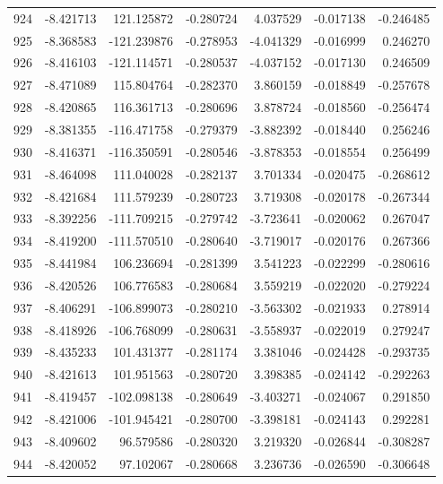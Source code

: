 \begin{tabular}{rrrrrrr}
 924 &  -8.421713 &  121.125872 & -0.280724 &   4.037529 &  -0.017138 & -0.246485 \\
 925 &  -8.368583 & -121.239876 & -0.278953 &  -4.041329 &  -0.016999 &  0.246270 \\
 926 &  -8.416103 & -121.114571 & -0.280537 &  -4.037152 &  -0.017130 &  0.246509 \\
 927 &  -8.471089 &  115.804764 & -0.282370 &   3.860159 &  -0.018849 & -0.257678 \\
 928 &  -8.420865 &  116.361713 & -0.280696 &   3.878724 &  -0.018560 & -0.256474 \\
 929 &  -8.381355 & -116.471758 & -0.279379 &  -3.882392 &  -0.018440 &  0.256246 \\
 930 &  -8.416371 & -116.350591 & -0.280546 &  -3.878353 &  -0.018554 &  0.256499 \\
 931 &  -8.464098 &  111.040028 & -0.282137 &   3.701334 &  -0.020475 & -0.268612 \\
 932 &  -8.421684 &  111.579239 & -0.280723 &   3.719308 &  -0.020178 & -0.267344 \\
 933 &  -8.392256 & -111.709215 & -0.279742 &  -3.723641 &  -0.020062 &  0.267047 \\
 934 &  -8.419200 & -111.570510 & -0.280640 &  -3.719017 &  -0.020176 &  0.267366 \\
 935 &  -8.441984 &  106.236694 & -0.281399 &   3.541223 &  -0.022299 & -0.280616 \\
 936 &  -8.420526 &  106.776583 & -0.280684 &   3.559219 &  -0.022020 & -0.279224 \\
 937 &  -8.406291 & -106.899073 & -0.280210 &  -3.563302 &  -0.021933 &  0.278914 \\
 938 &  -8.418926 & -106.768099 & -0.280631 &  -3.558937 &  -0.022019 &  0.279247 \\
 939 &  -8.435233 &  101.431377 & -0.281174 &   3.381046 &  -0.024428 & -0.293735 \\
 940 &  -8.421613 &  101.951563 & -0.280720 &   3.398385 &  -0.024142 & -0.292263 \\
 941 &  -8.419457 & -102.098138 & -0.280649 &  -3.403271 &  -0.024067 &  0.291850 \\
 942 &  -8.421006 & -101.945421 & -0.280700 &  -3.398181 &  -0.024143 &  0.292281 \\
 943 &  -8.409602 &   96.579586 & -0.280320 &   3.219320 &  -0.026844 & -0.308287 \\
 944 &  -8.420052 &   97.102067 & -0.280668 &   3.236736 &  -0.026590 & -0.306648 \\

\end{tabular}
